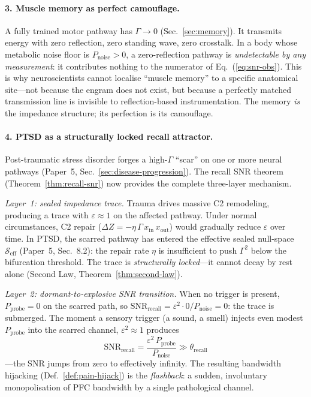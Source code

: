 \documentclass[aps,pre,twocolumn,superscriptaddress,floatfix]{revtex4-2}
\begin{document}
\paragraph{3. Muscle memory as perfect camouflage.}
A fully trained motor pathway has
$\Gamma \to 0$ (Sec.~\ref{sec:memory}).
It transmits energy with zero reflection, zero
standing wave, zero crosstalk.
In a body whose metabolic noise floor is
$P_{\text{noise}} > 0$, a zero-reflection pathway
is \emph{undetectable by any measurement}:
it contributes nothing to the numerator of
Eq.~(\ref{eq:snr-obs}).
This is why neuroscientists cannot localise
``muscle memory'' to a specific anatomical site---not
because the engram does not exist, but because a
perfectly matched transmission line is invisible
to reflection-based instrumentation.
The memory \emph{is} the impedance structure;
its perfection is its camouflage.

\paragraph{4. PTSD as a structurally locked recall attractor.}
Post-traumatic stress disorder forges a
high-$\Gamma$ ``scar'' on one or more neural
pathways (Paper~5, Sec.~\ref{sec:disease-progression}).
The recall SNR theorem (Theorem~\ref{thm:recall-snr})
now provides the complete three-layer mechanism.

\emph{Layer~1: sealed impedance trace.}
Trauma drives massive C2 remodeling, producing
a trace with $\varepsilon \approx 1$ on the
affected pathway.
Under normal circumstances, C2 repair
($\Delta Z = -\eta\,\Gamma\,x_{\text{in}}\,x_{\text{out}}$)
would gradually reduce $\varepsilon$ over time.
In PTSD, the scarred pathway has entered the
effective sealed null-space $\mathcal{S}_{\text{eff}}$
(Paper~5, Sec.~8.2):
the repair rate $\eta$ is insufficient to push
$\Gamma^2$ below the bifurcation threshold.
The trace is \emph{structurally locked}---it
cannot decay by rest alone
(Second Law, Theorem~\ref{thm:second-law}).

\emph{Layer~2: dormant-to-explosive SNR transition.}
When no trigger is present, $P_{\text{probe}} = 0$
on the scarred path, so
$\mathrm{SNR}_{\text{recall}}
= \varepsilon^2 \cdot 0 / P_{\text{noise}} = 0$:
the trace is submerged.
The moment a sensory trigger (a sound, a smell)
injects even modest $P_{\text{probe}}$ into the
scarred channel, $\varepsilon^2 \approx 1$ produces
\begin{equation}
  \mathrm{SNR}_{\text{recall}}
  = \frac{\varepsilon^2\,P_{\text{probe}}}{P_{\text{noise}}}
  \gg \theta_{\text{recall}}
  \label{eq:ptsd-snr}
\end{equation}
---the SNR jumps from zero to effectively infinity.
The resulting bandwidth hijacking
(Def.~\ref{def:pain-hijack}) is the \emph{flashback}:
a sudden, involuntary monopolisation of PFC
bandwidth by a single pathological channel.
\end{document}
